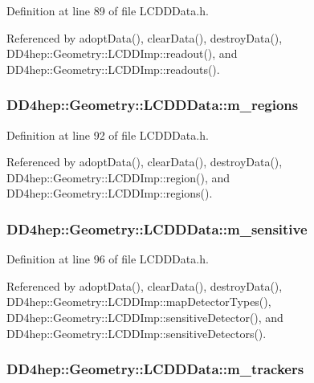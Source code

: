 Definition at line 89 of file LCDDData.h.

Referenced by adoptData(), clearData(), destroyData(), DD4hep::Geometry::LCDDImp::readout(), and DD4hep::Geometry::LCDDImp::readouts().\hypertarget{class_d_d4hep_1_1_geometry_1_1_l_c_d_d_data_af1b776d5f35d48149a80e6d705984788}{
\subsubsection[{m\_\-regions}]{ {\bf DD4hep::Geometry::LCDDData::m\_\-regions}}}
\label{class_d_d4hep_1_1_geometry_1_1_l_c_d_d_data_af1b776d5f35d48149a80e6d705984788}


Definition at line 92 of file LCDDData.h.

Referenced by adoptData(), clearData(), destroyData(), DD4hep::Geometry::LCDDImp::region(), and DD4hep::Geometry::LCDDImp::regions().\hypertarget{class_d_d4hep_1_1_geometry_1_1_l_c_d_d_data_af86c69b812506c4e4543c7a845b040d0}{
\subsubsection[{m\_\-sensitive}]{ {\bf DD4hep::Geometry::LCDDData::m\_\-sensitive}}}
\label{class_d_d4hep_1_1_geometry_1_1_l_c_d_d_data_af86c69b812506c4e4543c7a845b040d0}


Definition at line 96 of file LCDDData.h.

Referenced by adoptData(), clearData(), destroyData(), DD4hep::Geometry::LCDDImp::mapDetectorTypes(), DD4hep::Geometry::LCDDImp::sensitiveDetector(), and DD4hep::Geometry::LCDDImp::sensitiveDetectors().\hypertarget{class_d_d4hep_1_1_geometry_1_1_l_c_d_d_data_a0e76f8fc72b987e8b7e115fc7e9b7483}{
\subsubsection[{m\_\-trackers}]{ {\bf DD4hep::Geometry::LCDDData::m\_\-trackers}}}
\label{class_d_d4hep_1_1_geometry_1_1_l_c_d_d_data_a0e76f8fc72b987e8b7e115fc7e9b7483}


